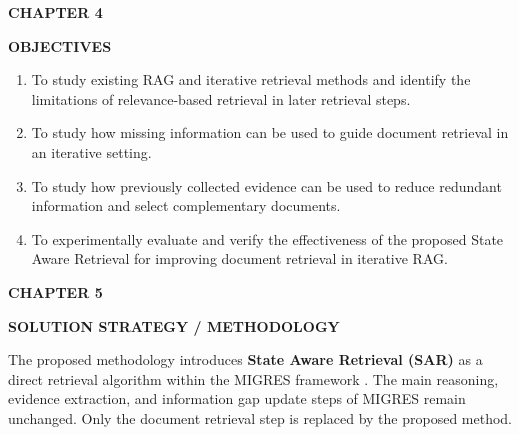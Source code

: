 \documentclass[12pt,a4paper]{report}
\newcommand{\chaptertitle}[2]{
    \begin{center}
        {\fontsize{18}{21}\selectfont\bfseries CHAPTER #1\par}
        \vspace{0.10in}
        {\fontsize{18}{21}\selectfont\bfseries #2\par}
    \end{center}
    \vspace{0.12in}
}
\begin{document}



\chaptertitle{4}{OBJECTIVES}
\label{ch:4}

\begin{enumerate}[leftmargin=0.30in,itemsep=0.12in,parsep=0pt]

\item
To study existing RAG and iterative retrieval methods and identify the limitations of relevance-based retrieval in later retrieval steps.

\item
To study how missing information can be used to guide document retrieval in an iterative setting.

\item
To study how previously collected evidence can be used to reduce redundant information and select complementary documents.

\item
To experimentally evaluate and verify the effectiveness of the proposed State Aware Retrieval for improving document retrieval in iterative RAG.

\end{enumerate}
\clearpage






\setcounter{table}{0}
\renewcommand{\thetable}{5.\arabic{table}}
\setcounter{figure}{0}
\renewcommand{\thefigure}{5.\arabic{figure}}
\setcounter{chapter}{5}
\setcounter{section}{0}
\setcounter{subsection}{0}


\chaptertitle{5}{SOLUTION STRATEGY / METHODOLOGY}
\label{ch:5}

\justifying

The proposed methodology introduces \textbf{State Aware Retrieval (SAR)} as a direct retrieval algorithm within the MIGRES framework \cite{wang2025migres}. The main reasoning, evidence extraction, and information gap update steps of MIGRES remain unchanged. Only the document retrieval step is replaced by the proposed method.
\end{document}
